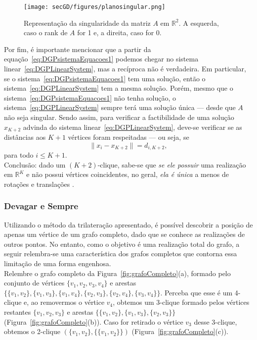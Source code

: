 \begin{figure}[H]
	\begin{center}
		\texttt{[image: secGD/figures/planosingular.png]}
	\end{center}
	\caption{Representação da singularidade da matriz $A$ em $\mathbb{R}^2$. A esquerda, caso o rank de $A$ for 1 e, a direita, caso for 0.}
	\label{fig:planosingular}
\end{figure}

Por fim, é importante mencionar que a partir da equação~\ref{eq:DGPsistemaEquacoes1} podemos chegar no sistema linear~\ref{eq:DGPLinearSystem}, mas a recíproca não é verdadeira. Em particular, se o sistema~\ref{eq:DGPsistemaEquacoes1} tem uma solução, então o sistema~\ref{eq:DGPLinearSystem} tem a mesma solução. Porém, mesmo que o sistema~\ref{eq:DGPsistemaEquacoes1} não tenha solução, o sistema~\ref{eq:DGPLinearSystem} sempre terá uma solução única --- desde que $A$ não seja singular. Sendo assim, para verificar a factibilidade de uma solução $x_{K+2}$ advinda do sistema linear~\ref{eq:DGPLinearSystem}, deve-se verificar se as distâncias aos $K+1$ vértices foram respeitadas --- ou seja, se $$\lVert x_i -x_{K+2} \rVert = d_{i,K+2},$$ para todo $i\leq K+1$. 
\\

Conclusão: dado um $(K+2)$-clique, sabe-se que \textit{se ele possuir} uma realização em $\mathbb{R}^{K}$ e não possui vértices coincidentes, no geral, \textit{ela é única} a menos de rotações e translações \cite{hendrickson1992conditions, connelly1991generic}.

\subsubsection{Devagar e Sempre}

Utilizando o método da trilateração apresentado, é possível descobrir a posição de apenas um vértice de um grafo completo, dado que se conhece as realizações de outros pontos. No entanto, como o objetivo é uma realização total do grafo, a seguir relembra-se uma característica dos grafos completos que contorna essa limitação de uma forma engenhosa.
\\

Relembre o grafo completo da Figura~\ref{fig:grafoCompleto}(a), formado pelo conjunto de vértices $\{v_1,v_2,v_3,v_4\}$ e arestas $\{\{v_1,v_2\}, \{v_1,v_3\}, \{v_1,v_4\}, \{v_2,v_3\}, \{v_2,v_4\},\{v_3,v_4\}\}$. Perceba que esse é um 4-clique e, ao removermos o vértice $v_4$, obtemos um $3$-clique formado pelos vértices restantes $\{v_1,v_2,v_3\}$ e arestas $\{\{v_1,v_2\}, \{v_1,v_3\}, \{v_2,v_3\}\}$ (Figura~\ref{fig:grafoCompleto}(b)). Caso for retirado o vértice $v_3$ desse 3-clique, obtemos o 2-clique $(\{v_1, v_2\}, \{\{v_1,v_2\}\})$ (Figura~\ref{fig:grafoCompleto}(c)). 

